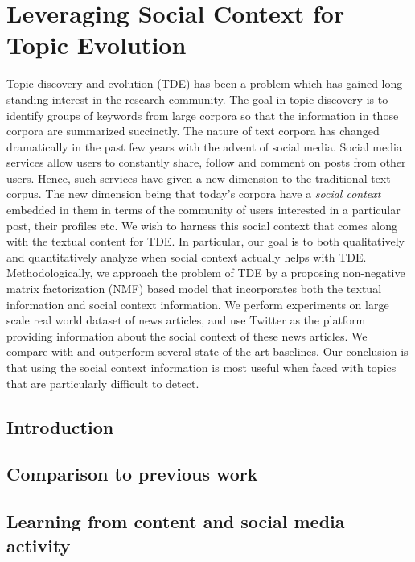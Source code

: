 \chapter{Leveraging Social Context for Topic Evolution}
\label{kdd_chapter}
Topic discovery and evolution (TDE) has been a problem which has gained
long standing interest in the research community.  The goal in
topic discovery is to identify groups of keywords from large corpora so that the information in those
corpora are summarized succinctly.  The nature of text corpora has changed
dramatically in the past few years with the advent of social media.  
Social media services allow users to constantly share, follow and comment
on posts from other users.  Hence, such services have given a new
dimension to the traditional text corpus.  The new dimension being that
today's corpora have a \emph{social context} embedded in them in terms of the
community of users interested in a particular post, their profiles etc.  
We wish to harness this social context that comes along with
the textual content for TDE.  In particular, our goal is to both
qualitatively and quantitatively analyze when
social context actually helps with TDE.
Methodologically, we approach the problem of TDE by a proposing non-negative matrix
factorization (NMF) based model 
that incorporates both the textual information
and social context information.  We
perform experiments on large scale real world
dataset of news articles, and use Twitter as the platform providing information
about the social context of these news articles.
We compare with and outperform
several state-of-the-art baselines. Our conclusion is that using
the social context information is most useful when
faced with topics that are particularly difficult to detect.
\section{Introduction}
\label{sec:introduction}


\section{Comparison to previous work}
\label{sec:comparison_to_previous_work}


\section{Learning from content and social media activity}
\label{sec:content_and_networks}


